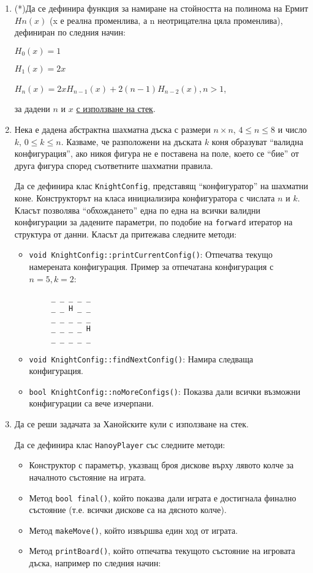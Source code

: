 \begin{enumerate}[resume]

 \item (*)Да се дефинира функция за намиране на стойността на полинома на Ермит $Hn(x)$ (x е реална променлива, а n неотрицателна цяла променлива), дефиниран по следния начин:

 $H_0(x)=1$

 $H_1(x)=2x$

 $H_n(x)=2xH_{n-1}(x)+2(n-1)H_{n-2}(x), n>1$,

 за дадени $n$ и $x$ \underline{с използване на стек}.


 \item Нека е дадена абстрактна шахматна дъска с размери $n \times n$, $4 \le n \le 8$ и число $k$, $0 \le k \le n$. Казваме, че разположени на дъската  $k$ коня образуват ``валидна конфигурация'', ако никоя фигура не е поставена на поле, което се ``бие'' от друга фигура според съответните шахматни правила.

 Да се дефинира клас \texttt{KnightConfig}, представящ ``конфигуратор'' на шахматни коне. Конструкторът на класа инициализира конфигуратора с числата $n$ и $k$. Класът позволява ``обхождането'' една по една на всички валидни конфигурации за дадените параметри, по подобие на \texttt{forward} итератор на структура от данни. Класът да притежава следните методи:

 \begin{itemize}
   \item \texttt{void KnightConfig::printCurrentConfig()}: Отпечатва текущо намерената конфигурация.
     Пример за отпечатана конфигурация с $n=5, k=2$:
     \begin{verbatim}
     _ _ _ _ _
     _ _ H _ _
     _ _ _ _ _
     _ _ _ _ H
     _ _ _ _ _

     \end{verbatim}
   \item \texttt{void KnightConfig::findNextConfig()}: Намира следваща конфигурация.
   \item \texttt{bool KnightConfig::noMoreConfigs()}: Показва дали всички възможни конфигурации са вече изчерпани.
 \end{itemize}

 \item Да се реши задачата за Ханойските кули с използване на стек.

 Да се дефинира клас \texttt{HanoyPlayer} със следните методи:

 \begin{itemize}
   \item Конструктор с параметър, указващ броя дискове върху лявото колче за началното състояние на играта.
   \item Метод \texttt{bool final()}, който показва дали играта е достигнала финално състояние (т.е. всички дискове са на дясното колче).
   \item Метод \texttt{makeMove()}, който извършва един ход от играта.
   \item Метод \texttt{printBoard()}, който отпечатва текущото състояние на игровата дъска, например по следния начин:
     \begin{verbatim}


\end{verbatim}
\end{itemize}
\end{enumerate}
